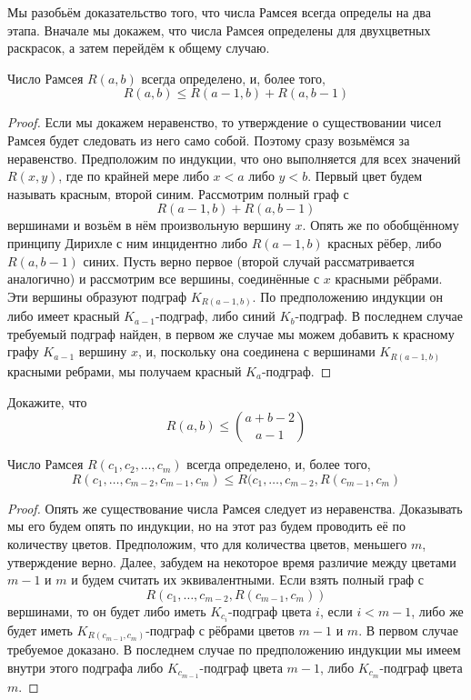Мы разобьём доказательство того, что числа Рамсея всегда определы на два этапа. Вначале мы докажем, что числа Рамсея определены для двухцветных раскрасок, а затем перейдём к общему случаю.

\begin{thm}
Число Рамсея $R(a, b)$ всегда определено, и, более того,
$$R(a, b) \le R(a - 1, b) + R(a, b- 1)$$
\end{thm}
\begin{proof}
Если мы докажем неравенство, то утверждение о существовании чисел Рамсея будет следовать из него само собой. Поэтому сразу возьмёмся за неравенство. Предположим по индукции, что оно выполняется для всех значений $R(x, y)$, где по крайней мере либо $x<a$ либо $y<b$. Первый цвет будем называть красным, второй синим. Рассмотрим полный граф с
$$R(a - 1, b) + R(a, b- 1)$$
вершинами и возьём в нём произвольную вершину $x$. Опять же по обобщённому принципу Дирихле с ним инцидентно либо $R(a-1, b)$ красных рёбер, либо $R(a, b-1)$ синих. Пусть верно первое (второй случай рассматривается аналогично) и рассмотрим все вершины, соединённые с $x$ красными рёбрами. Эти вершины образуют подграф $K_{R(a-1, b)}$. По предположению индукции он либо имеет красный $K_{a-1}$-подграф, либо синий $K_b$-подграф. В последнем случае требуемый подграф найден, в первом же случае мы можем добавить к красному графу $K_{a-1}$ вершину $x$, и, поскольку она соединена с вершинами $K_{R(a-1, b)}$ красными ребрами, мы получаем красный $K_a$-подграф.
\end{proof}

\begin{exercise}
Докажите, что
$$R(a, b) \le {a+b-2\choose a - 1}$$
\end{exercise}

\begin{thm}
Число Рамсея $R(c_1, c_2, \ldots, c_m)$ всегда определено, и, более того,
$$R(c_1, \ldots,c_{m-2}, c_{m-1}, c_m) \le R(c_1, \ldots, c_{m-2}, R(c_{m-1}, c_m)$$
\end{thm}
\begin{proof}
Опять же существование числа Рамсея следует из неравенства. Доказывать мы его будем опять по индукции, но на этот раз будем проводить её по количеству цветов. Предположим, что для количества цветов, меньшего $m$, утверждение верно. Далее, забудем на некоторое время различие между цветами $m-1$ и $m$ и будем считать их эквивалентными. Если взять полный граф с
$$R(c_1, \ldots, c_{m-2}, R(c_{m-1}, c_m))$$
вершинами, то он будет либо иметь $K_{c_i}$-подграф цвета $i$, если $i<m-1$, либо же будет иметь $K_{R(c_{m-1}, c_m)}$-подграф с рёбрами цветов $m-1$ и $m$. В первом случае требуемое доказано. В последнем случае по предположению индукции мы имеем внутри этого подграфа либо $K_{c_{m-1}}$-подграф цвета $m-1$, либо $K_{c_m}$-подграф цвета $m$.
\end{proof}

